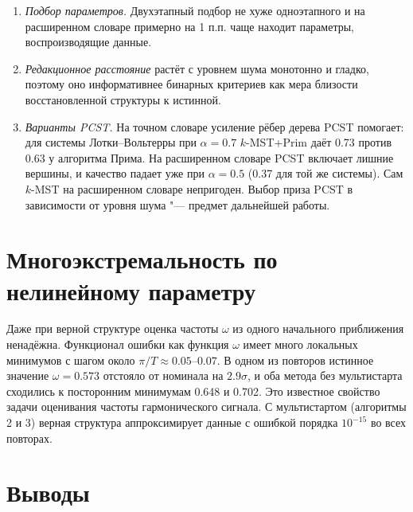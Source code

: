 \documentclass[12pt]{article}
\begin{document}
\begin{enumerate}
\item \emph{Подбор параметров.} Двухэтапный подбор не хуже одноэтапного и на расширенном словаре примерно на 1 п.п. чаще находит параметры, воспроизводящие данные.
\item \emph{Редакционное расстояние} растёт с уровнем шума монотонно и гладко, поэтому оно информативнее бинарных критериев как мера близости восстановленной структуры к истинной.
\item \emph{Варианты PCST.} На точном словаре усиление рёбер дерева PCST помогает: для системы Лотки--Вольтерры при $\alpha=0.7$ $k$-MST+Prim даёт 0.73 против 0.63 у алгоритма Прима. На расширенном словаре PCST включает лишние вершины, и качество падает уже при $\alpha=0.5$ (0.37 для той же системы). Сам $k$-MST на расширенном словаре непригоден. Выбор приза PCST в зависимости от уровня шума "--- предмет дальнейшей работы.
\end{enumerate}

\section{Многоэкстремальность по нелинейному параметру}

Даже при верной структуре оценка частоты $\omega$ из одного начального приближения ненадёжна. Функционал ошибки как функция $\omega$ имеет много локальных минимумов с шагом около $\pi/T\approx0.05$--$0.07$. В одном из повторов истинное значение $\omega=0.573$ отстояло от номинала на $2.9\sigma$, и оба метода без мультистарта сходились к посторонним минимумам 0.648 и 0.702. Это известное свойство задачи оценивания частоты гармонического сигнала. С мультистартом (алгоритмы 2 и 3) верная структура аппроксимирует данные с ошибкой порядка $10^{-15}$ во всех повторах.

\section{Выводы}
\end{document}
